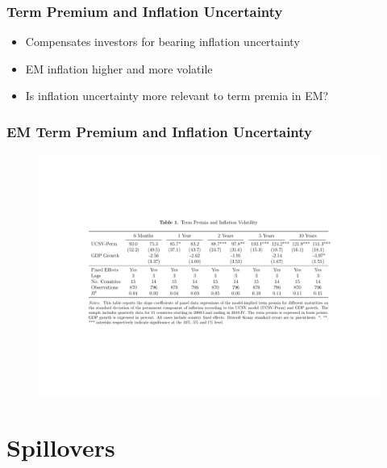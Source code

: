 \documentclass[12pt, aspectratio=169, xcolor=dvipsnames]{beamer}  %
\begin{document}
\begin{frame}[label=tpUCSV]
\frametitle{Term Premium and Inflation Uncertainty}
\begin{itemize}
	\item Compensates investors for bearing inflation uncertainty \citep{Wright:2011}
	\item EM inflation higher and more volatile \citep{HaKoseOhnsorge:2019}
	\item Is inflation uncertainty more relevant to term premia in EM?
\end{itemize}
\end{frame}

\begin{frame}
\frametitle{EM Term Premium and Inflation Uncertainty}
%	
\vspace{-0.8cm}
\begin{figure}[!htbp]
\begin{center} %
	\includegraphics[trim={2cm 6cm 2cm 6.5cm},clip, width=1\textwidth,height=0.7\textheight]{../Tables/tpucsv.pdf}
	\par\end{center}
\end{figure}
\end{frame}


\section{Spillovers}
\end{document}

